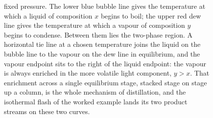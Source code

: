 \begin{figure}[htbp]
{fixed pressure. The lower blue bubble line gives the temperature at which a
liquid of composition $x$ begins to boil; the upper red dew line gives the
temperature at which a vapour of composition $y$ begins to condense. Between
them lies the two-phase region. A horizontal tie line at a chosen temperature
joins the liquid on the bubble line to the vapour on the dew line in
equilibrium, and the vapour endpoint sits to the right of the liquid
endpoint: the vapour is always enriched in the more volatile light component,
$y>x$. That enrichment across a single equilibrium stage, stacked stage on
stage up a column, is the whole mechanism of distillation, and the isothermal
flash of the worked example lands its two product streams on these two
curves.}
\label{fig:vol04ch02:txy-distillation}
\end{figure}
